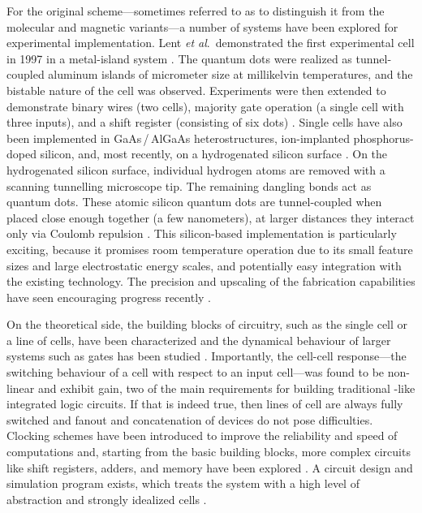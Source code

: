 For the original  scheme---sometimes referred to as  to
distinguish it from the molecular and magnetic variants---a number of systems
have been explored for experimental implementation. Lent \emph{et al}.\
demonstrated the first experimental  cell in 1997 in a metal-island
system \cite{orlov1997realization}. The quantum dots were realized as
tunnel-coupled aluminum islands of micrometer size at millikelvin temperatures,
and the bistable nature of the cell was observed.  Experiments were then
extended to demonstrate binary wires (two cells), majority gate operation (a
single cell with three inputs), and a shift register (consisting of six dots)
\cite{orlov1999experimental} \cite{amlani1999digital}
\cite{kummamuru2003operation}. Single  cells have also been
implemented in GaAs\,/\,AlGaAs heterostructures, ion-implanted phosphorus-doped
silicon, and, most recently, on a hydrogenated silicon surface
\cite{gardelis2003evidence} \cite{mitic2006demonstration}
\cite{haider2009controlled}. On the hydrogenated silicon surface, individual
hydrogen atoms are removed with a scanning tunnelling microscope tip. The
remaining dangling bonds act as quantum dots.  These atomic silicon quantum dots
are tunnel-coupled when placed close enough together (a few nanometers), at
larger distances they interact only via Coulomb repulsion
\cite{pitters2011tunnel}. This silicon-based  implementation is
particularly exciting, because it promises room temperature operation due to its
small feature sizes and large electrostatic energy scales, and potentially easy
integration with the existing \cgls{CMOS} technology. The precision and
upscaling of the fabrication capabilities have seen encouraging progress
recently \cite{wolkow2013silicon}.


On the theoretical side, the building blocks of  circuitry, such as
the single cell or a line of cells, have been characterized and the dynamical
behaviour of larger systems such as gates has been studied \cite{lent1993lines}
\cite{tougaw1996dynamic}. Importantly, the cell-cell response---the switching
behaviour of a cell with respect to an input cell---was found to be non-linear
and exhibit gain, two of the main requirements for building traditional
\cgls{CMOS}-like integrated logic circuits. If that is indeed true, then lines
of cell are always fully switched and fanout and concatenation of devices do not
pose difficulties.  Clocking schemes have been introduced to improve the
reliability and speed of \cgls{QCA} computations and, starting from the basic
building blocks, more complex circuits like shift registers, adders, and memory
have been explored \cite{lent1997device} \cite{hennessy2001clocking}
\cite{rahimi2008quantum}. A circuit design and simulation program exists, which
treats the \cgls{QCA} system with a high level of abstraction and strongly
idealized cells \cite{walus2004qcadesigner}.

